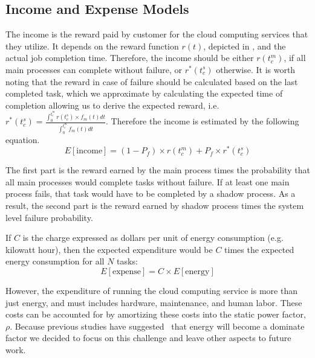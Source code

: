 \subsection{Income and Expense Models}
The income is the reward paid by customer for the cloud computing
services that they utilize. It depends on the reward function $r(t)$,
depicted in , and the actual job completion
time. Therefore, the income should be either $r(t_c^m)$, if all main
processes can complete without failure, or $r^*(t_c^s)$ otherwise. It
is worth noting that the reward in case of failure should be
calculated based on the last completed task, which we approximate by
calculating the expected time of completion allowing us to derive the
expected reward, i.e. $r^*(t_c^s)=\frac{\int_0^{t_c^m}r(t_c^s) \times
f_m(t)dt}{\int_0^{t_c^m}f_m(t)dt}$. Therefore the income is estimated
by the following equation.
\begin{equation}
E[\text{income}]= (1-P_f) \times r(t_c^m) + P_f \times r^*(t_c^s)
\end{equation}


The first part is the reward earned by the main process times the
probability that all main processes would complete tasks without
failure. If at least one main process fails, that task would have to
be completed by a shadow process. As a result, the second part is the
reward earned by shadow process times the system level failure probability.

If $C$ is the charge expressed as dollars per unit of energy consumption
(e.g. kilowatt hour), then the expected expenditure would be $C$ times
the expected energy consumption for all $N$ tasks:
\begin{equation}
E[\text{expense}] = C \times E[\text{energy}]
\label{eq:expense}
\end{equation}

However, the expenditure of running the cloud computing service is more
than just energy, and must includes hardware, maintenance, and human
labor. These costs can be accounted for by amortizing these costs into the
static power factor, $\rho$. Because previous studies have
suggested~\cite{Elnozahy03energyconservation,Raghavendra:2008:NPS}
that energy will become a dominate factor we decided to focus on this
challenge and leave other aspects to future work.


